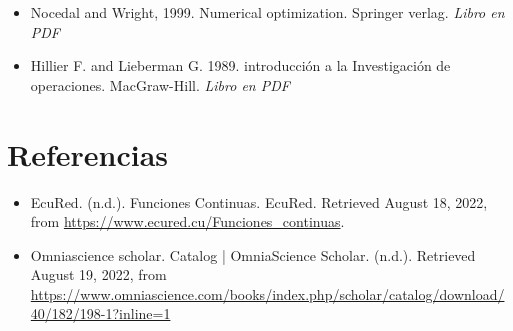 \documentclass[12pt,oneside]{book}
\begin{document}
\begin{itemize}
    \item Nocedal and Wright, 1999. Numerical optimization. Springer verlag. \textit{Libro en PDF}
    \item Hillier F. and Lieberman G. 1989. introducción  a la Investigación de operaciones. MacGraw-Hill. \textit{Libro en PDF}
\end{itemize}


\chapter{Referencias}

\begin{itemize}
    \item EcuRed. (n.d.). Funciones Continuas. EcuRed. Retrieved August 18, 2022, from \url{https://www.ecured.cu/Funciones_continuas}.
    \item Omniascience scholar. Catalog | OmniaScience Scholar. (n.d.). Retrieved August 19, 2022, from \url{https://www.omniascience.com/books/index.php/scholar/catalog/download/40/182/198-1?inline=1}
\end{itemize}
\end{document}
